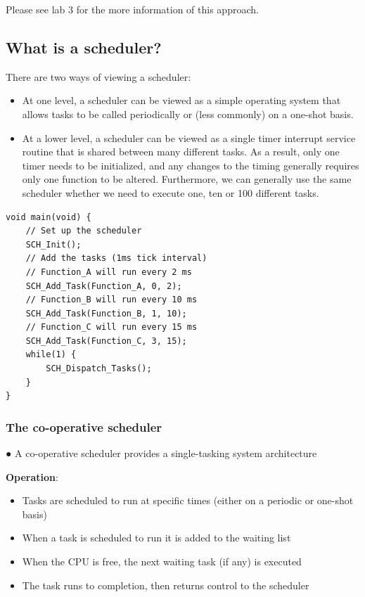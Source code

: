 Please see lab 3 for the more information of this approach. 

\subsection{What is a scheduler?}
There are two ways of viewing a scheduler:
\begin{itemize}
    \item  At one level, a scheduler can be viewed as a simple operating system that allows
tasks to be called periodically or (less commonly) on a one-shot basis.  
    \item  At a lower level, a scheduler can be viewed as a single timer interrupt service routine that is shared between many different tasks. As a result, only one timer needs to be  initialized, and any changes to the timing generally requires only one function to be altered. Furthermore, we can generally use the same scheduler whether we need to execute one, ten or 100 different tasks. 

\end{itemize}
\begin{lstlisting}[caption=Example of how a scheduler uses]
void main(void) {
    // Set up the scheduler
    SCH_Init();
    // Add the tasks (1ms tick interval)
    // Function_A will run every 2 ms
    SCH_Add_Task(Function_A, 0, 2);
    // Function_B will run every 10 ms
    SCH_Add_Task(Function_B, 1, 10);
    // Function_C will run every 15 ms
    SCH_Add_Task(Function_C, 3, 15);
    while(1) {
        SCH_Dispatch_Tasks();
    } 
}
\end{lstlisting}

\subsubsection{The co-operative scheduler}

● A co-operative scheduler provides a single-tasking system architecture

\textbf{Operation}:
\begin{itemize}
    \item Tasks are scheduled to run at specific times (either on a periodic or one-shot basis)
\item When a task is scheduled to run it is added to the waiting list
\item When the CPU is free, the next waiting task (if any) is executed
\item The task runs to completion, then returns control to the scheduler
\end{itemize}


